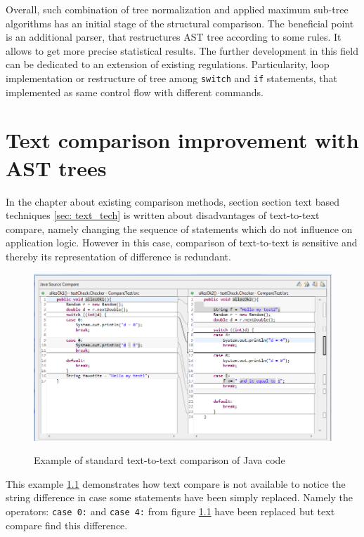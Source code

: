 \documentclass{report}
\begin{document}
Overall, such combination of tree normalization and applied maximum sub-tree algorithms has an initial stage of the structural comparison. The beneficial point is an additional parser, that restructures AST tree according to some rules. It allows to get more precise statistical results. The further development in this field can be dedicated to an extension of existing regulations. Particularity, loop implementation or restructure of tree among \texttt{switch} and \texttt{if} statements, that implemented as same control flow with different commands. 


\chapter{Text comparison improvement with AST trees}
\label{sec:text-improvement}

In the chapter about existing comparison methods, section section text based techniques \ref{sec: text_tech} is written about disadvantages of text-to-text compare, namely changing the sequence of statements which do not influence on application logic. However in this case, comparison of text-to-text is sensitive  and thereby its representation of difference is redundant.

\begin{figure}[h]
  \centering
  \includegraphics[scale = 0.5]{Figures/text-to-text/text-compare-shifted.png}\\[0.1cm]
  \caption[Text to text comparison example not optimized]{Example of standard text-to-text comparison of Java code}
  \label{fig:text-to-text-compare-shifted}
\end{figure}

This example \ref{fig:text-to-text-compare-shifted} demonstrates how text compare is not available to notice the string difference in case some statements have been simply replaced. Namely the operators: \texttt{case 0:} and \texttt{case 4:} from figure \ref{fig:text-to-text-compare-shifted} have been replaced but text compare find this difference. 
\end{document}
